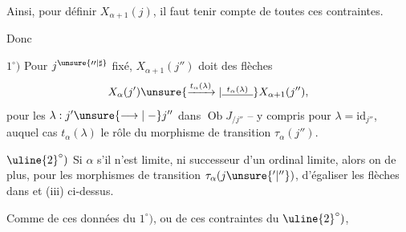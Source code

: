 Ainsi, pour définir  $X_{\alpha+1}(j)$, il faut  tenir compte de toutes ces contraintes.

Donc

$1^\circ)$ Pour $j^{\unsure{\prime\prime|\sharp}}$ fixé, $X_{\alpha+1}(j'')$ doit  des flèches
\[
 X_\alpha(j') \unsure{\xrightarrow{t_\alpha(\lambda)}|\overset{t_\alpha(\lambda)}{\rule{2.8em}{0.4pt}}} X_{\alpha+1}(j''),
\]
pour les $\lambda:j'\unsure{\longrightarrow|\mathrel{-}}j''$ dans $\operatorname{Ob}J_{/j''}$ -- y compris pour $\lambda=\mathrm{id}_{j''}$, auquel cas $t_\alpha(\lambda)$  le rôle du morphisme de transition $\tau_\alpha(j'')$.

$\uline{2}^\circ)$ Si $\alpha$     s'il n'est   limite, ni  successeur d'un ordinal limite, alors on  de plus, pour les morphismes de transition $\tau_\alpha(j\unsure{'|''})$,  d'égaliser les  flèches  dans  et (iii) ci-dessus.

Comme  de ces données du $1^\circ)$, ou de ces contraintes du $\uline{2}^\circ)$,
